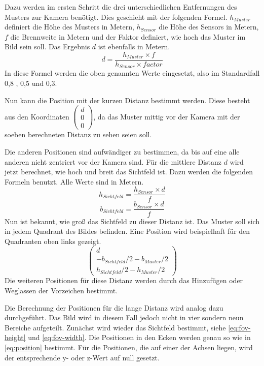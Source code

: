 Dazu werden im ersten Schritt die drei unterschiedlichen Entfernungen des Musters zur Kamera benötigt. Dies geschieht mit der folgenden Formel. $h_{Muster}$ definiert die Höhe des Musters in Metern, $h_{Sensor}$ die Höhe des Sensors in Metern, $f$ die Brennweite in Metern und der Faktor definiert, wie hoch das Muster im Bild sein soll. Das Ergebnis $d$ ist ebenfalls in Metern.
\begin{equation}
	d = \frac{h_{Muster} \times f }{h_{Sensor} \times factor}
\end{equation}
In diese Formel werden die oben genannten Werte eingesetzt, also im Standardfall 0,8 , 0,5 und 0,3.

Nun kann die Position mit der kurzen Distanz bestimmt werden. Diese besteht aus den Koordinaten $\begin{pmatrix}
	d\\ 0\\ 0
\end{pmatrix}$, da das Muster mittig vor der Kamera mit der soeben berechneten Distanz zu sehen seien soll.

Die anderen Positionen sind aufwändiger zu bestimmen, da bis auf eine alle anderen nicht zentriert vor der Kamera sind. Für die mittlere Distanz $d$ wird jetzt berechnet, wie hoch und breit das Sichtfeld ist. Dazu werden die folgenden Formeln benutzt. Alle Werte sind in Metern.
\begin{equation}\label{eq:fov-height}
	h_{Sichtfeld} = \frac{h_{Sensor} \times d}{f}
\end{equation}
\begin{equation}\label{eq:fov-width}
	b_{Sichtfeld} = \frac{b_{Sensor} \times d}{f}
\end{equation}
Nun ist bekannt, wie groß das Sichtfeld zu dieser Distanz ist. Das Muster soll sich in jedem Quadrant des Bildes befinden. Eine Position wird beispielhaft für den Quadranten oben links gezeigt.
\begin{equation}\label{eq:position}
	\begin{pmatrix}
		d\\
		-b_{Sichtfeld} / 2 - b_{Muster} / 2\\
		h_{Sichtfeld} / 2 - h_{Muster} / 2
	\end{pmatrix}
\end{equation}
Die weiteren Positionen für diese Distanz werden durch das Hinzufügen oder Weglassen der Vorzeichen bestimmt.

Die Berechnung der Positionen für die lange Distanz wird analog dazu durchgeführt. Das Bild wird in diesem Fall jedoch nicht in vier sondern neun Bereiche aufgeteilt. Zunächst wird wieder das Sichtfeld bestimmt, siehe \autoref{eq:fov-height} und \autoref{eq:fov-width}. Die Positionen in den Ecken werden genau so wie in \autoref{eq:position} bestimmt. Für die Positionen, die auf einer der Achsen liegen, wird der entsprechende y- oder z-Wert auf null gesetzt.

